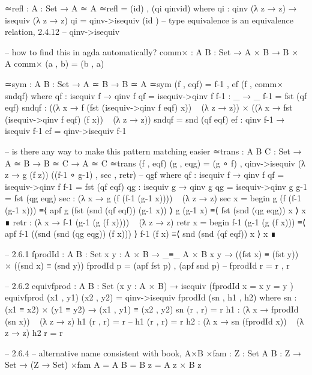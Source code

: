 \documentclass[11pt, a4paper]{article}
\begin{document}
\begin{code}
  ≃refl : {A : Set} → A ≃ A
  ≃refl = (id) , (qi qinvid)
    where
      qi : qinv (λ z → z) → isequiv (λ z → z)
      qi = qinv->isequiv (id )
  -- type equivalence is an equivalence relation, 2.4.12
  -- qinv->isequiv

  -- how to find this in agda automatically?
  comm× : {A B : Set} → A × B → B × A
  comm× (a , b) = (b , a)

  ≃sym : {A B : Set} → A ≃ B → B ≃ A
  ≃sym (f , eqf) = f-1 , ef (f , comm× sndqf)
    where
      qf : isequiv f → qinv f
      qf = isequiv->qinv f 
      f-1 : _ → _
      f-1 = fst (qf eqf)
      sndqf : ((λ x → f (fst (isequiv->qinv f eqf) x)) ~ (λ z → z)) ×
                ((λ x → fst (isequiv->qinv f eqf) (f x)) ~ (λ z → z))
      sndqf = snd (qf eqf)
      ef : qinv f-1 → isequiv f-1
      ef = qinv->isequiv f-1

  -- is there any way to make this pattern matching easier
  ≃trans : {A B C : Set} → A ≃ B → B ≃ C → A ≃ C
  ≃trans (f , eqf) (g , eqg) = (g ∘ f) , qinv->isequiv (λ z → g (f z)) ((f-1 ∘ g-1) , sec , retr) -- qgf
    where
      qf : isequiv f → qinv f
      qf = isequiv->qinv f
      f-1 = fst (qf eqf)
      qg : isequiv g → qinv g
      qg = isequiv->qinv g
      g-1 = fst (qg eqg)
      sec : (λ x → g (f (f-1 (g-1 x)))) ~ (λ z → z)
      sec x = 
              begin g (f (f-1 (g-1 x)))
              ≡⟨ apf g (fst (snd (qf eqf)) (g-1 x)) ⟩
              g (g-1 x)
              ≡⟨ fst (snd (qg eqg)) x ⟩
              x ∎
      retr : (λ x → f-1 (g-1 (g (f x)))) ~ (λ z → z)
      retr x =
               begin f-1 (g-1 (g (f x)))
               ≡⟨ apf f-1 ((snd (snd (qg eqg)) (f x))) ⟩
               f-1 (f x)
               ≡⟨ snd (snd (qf eqf)) x ⟩
               x ∎


  -- 2.6.1
  fprodId : {A B : Set} {x y : A × B} → _≡_ {A × B} x y → ((fst x) ≡ (fst y)) × ((snd x) ≡ (snd y))
  fprodId p = (apf fst p) , (apf snd p)
  -- fprodId r = r , r

  -- 2.6.2
  equivfprod : {A B : Set} (x y : A × B) → isequiv (fprodId {x = x} {y = y} ) 
  equivfprod (x1 , y1) (x2 , y2) = qinv->isequiv fprodId (sn , h1 , h2)
    where
      sn : (x1 ≡ x2) × (y1 ≡ y2) → (x1 , y1) ≡ (x2 , y2)
      sn (r , r) = r
      h1 : (λ x → fprodId (sn x)) ~ (λ z → z)
      h1 (r , r) = r
      -- h1 (r , r) = r
      h2 : (λ x → sn (fprodId x)) ~ (λ z → z)
      h2 r = r

  -- 2.6.4
  -- alternative name consistent with book, A×B
  ×fam : {Z : Set} {A B : Z → Set} → (Z → Set)
  ×fam {A = A} {B = B} z = A z × B z


\end{code}
\end{document}
